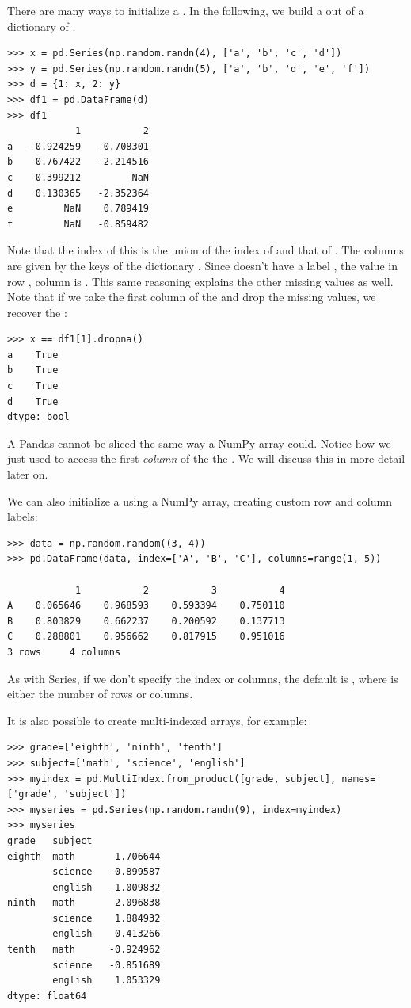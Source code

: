 There are many ways to initialize a . In the following, we build a  out of a
dictionary of .
\begin{lstlisting}
>>> x = pd.Series(np.random.randn(4), ['a', 'b', 'c', 'd'])
>>> y = pd.Series(np.random.randn(5), ['a', 'b', 'd', 'e', 'f'])
>>> d = {1: x, 2: y}
>>> df1 = pd.DataFrame(d)
>>> df1
	        1	        2
a	-0.924259	-0.708301
b	 0.767422	-2.214516
c	 0.399212	      NaN
d	 0.130365	-2.352364
e	      NaN	 0.789419
f	      NaN	-0.859482
\end{lstlisting}
Note that the index of this  is the union of the index of   and that of  .
The columns are given by the keys of the dictionary . Since  doesn't have a label , the
value in row , column  is . This same reasoning explains the other missing values as well.
Note that if we take the first column of the  and drop the missing values, we recover the  :
\begin{lstlisting}
>>> x == df1[1].dropna()
a    True
b    True
c    True
d    True
dtype: bool
\end{lstlisting}

\begin{warn}
A Pandas  cannot be sliced the same way a NumPy array could.
Notice how we just used  to access the first \emph{column} of the the  .
We will discuss this in more detail later on.
\end{warn}

We can also initialize a  using a NumPy array, creating custom row and column labels:
\begin{lstlisting}
>>> data = np.random.random((3, 4))
>>> pd.DataFrame(data, index=['A', 'B', 'C'], columns=range(1, 5))

            1	        2	        3	        4
A	 0.065646	 0.968593	 0.593394	 0.750110
B	 0.803829	 0.662237	 0.200592	 0.137713
C	 0.288801	 0.956662	 0.817915	 0.951016
3 rows     4 columns
\end{lstlisting}
As with Series, if we don't specify the index or columns, the default is , where 
is either the number of rows or columns.

It is also possible to create multi-indexed arrays, for example:
\begin{lstlisting}
>>> grade=['eighth', 'ninth', 'tenth']
>>> subject=['math', 'science', 'english']
>>> myindex = pd.MultiIndex.from_product([grade, subject], names=['grade', 'subject'])
>>> myseries = pd.Series(np.random.randn(9), index=myindex)
>>> myseries
grade   subject
eighth  math       1.706644
        science   -0.899587
        english   -1.009832
ninth   math       2.096838
        science    1.884932
        english    0.413266
tenth   math      -0.924962
        science   -0.851689
        english    1.053329
dtype: float64
\end{lstlisting}

